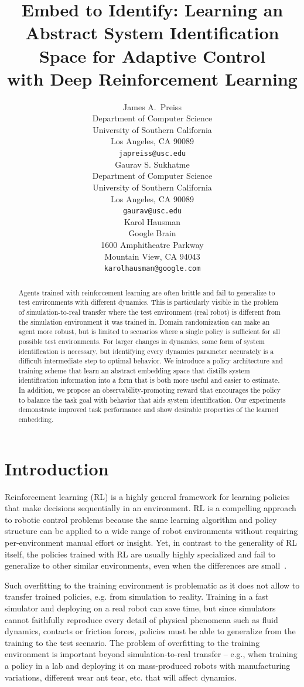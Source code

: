 \documentclass{article}
\title{Embed to Identify: Learning an Abstract System Identification Space for Adaptive Control\\ with Deep Reinforcement Learning}
\author{
  James A.~Preiss \\
  Department of Computer Science\\
  University of Southern California\\
  Los Angeles, CA 90089\\
  \texttt{japreiss@usc.edu} \\
  \And
  Gaurav S. Sukhatme \\
  Department of Computer Science\\
  University of Southern California\\
  Los Angeles, CA 90089\\
  \texttt{gaurav@usc.edu} \\
  \AND
  Karol Hausman \\
  Google Brain \\
  1600 Amphitheatre Parkway\\
  Mountain View, CA 94043 \\
  \texttt{karolhausman@google.com} \\
}
\begin{document}
\maketitle

\begin{abstract}
Agents trained with reinforcement learning are often brittle and fail to generalize to test environments with different dynamics.
This is particularly visible in the problem of simulation-to-real transfer where the test environment (real robot) is different from the simulation environment it was trained in.
Domain randomization can make an agent more robust,
but is limited to scenarios where a single policy is sufficient for all possible test environments.
For larger changes in dynamics, some form of system identification is necessary,
but identifying every dynamics parameter accurately is a difficult intermediate step to optimal behavior.
We introduce a policy architecture and training scheme that learn an abstract embedding space
that distills system identification information into a form that is both more useful and easier to estimate.
In addition, we propose an observability-promoting reward that encourages the policy to balance the task goal with behavior that aids system identification.
Our experiments demonstrate improved task performance and show desirable properties of the learned embedding.
\end{abstract}

\section{Introduction}

Reinforcement learning (RL) is a highly general framework for learning policies that make decisions sequentially in an environment.
RL is a compelling approach to robotic control problems
because the same learning algorithm and policy structure can be applied to a wide range of robot environments
without requiring per-environment manual effort or insight.
Yet, in contrast to the generality of RL itself,
the policies trained with RL are usually highly specialized and fail to generalize to other similar environments,
even when the differences are small~\citep{zhang-study-on-overfitting}.

Such overfitting to the training environment is problematic as it does not allow to transfer trained policies, e.g. from simulation to reality. Training in a fast simulator and deploying on a real robot can save time,
but since simulators cannot faithfully reproduce every detail of physical phenomena such as fluid dynamics, contacts or friction forces, policies must be able to generalize from the training to the test scenario.
The problem of overfitting to the training environment is important beyond simulation-to-real transfer -- e.g., when training a policy in a lab and deploying it on mass-produced robots with manufacturing variations, different wear ant tear, etc. that will affect dynamics.
\end{document}
